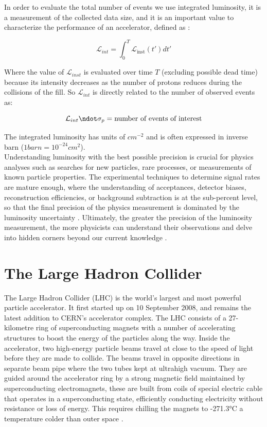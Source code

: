 In order to evaluate the total number of events we use integrated luminosity, it is a measurement of the collected data size, and it is an important value to characterize the performance of an accelerator, defined as \cite{concept_of_luminosity}:

\begin{equation}
  \mathcal{L}_{int}=\int_{0}^{T} \mathcal {L}_{\text{inst}}(t') dt'
\end{equation}

Where the value of $\mathcal{L}_{inst}$ is evaluated over time $T$ (excluding possible dead time) because its intensity decreases as the number of protons reduces during the collisions of the fill. So $\mathcal{L}_{int}$ is directly related to the number of observed events as:

\begin{equation}
  \mathcal{L}_{int} \ndot \sigma_{p}= \text{number of events of interest}
\end{equation}

The integrated luminosity has units of $cm^{-2}$ and is often expressed in inverse barn ($1 barn= 10^{-24}cm^{2}$). \\

Understanding luminosity with the best possible precision is crucial for physics analyses such as searches for new particles, rare processes, or measurements of known particle properties.
The experimental techniques to determine signal rates are mature enough, where the understanding of acceptances, detector biases, reconstruction efficiencies, or background subtraction is at the sub-percent level, so that the final precision of the physics measurement is dominated by the luminosity uncertainty . Ultimately, the greater the precision of the luminosity measurement, the more physicists can understand their observations and delve into hidden corners beyond our current knowledge \cite{luminosity_importance}.

\section{The Large Hadron Collider}

The Large Hadron Collider (LHC) is the world’s largest and most powerful particle accelerator. It first started up on 10 September 2008, and remains the latest addition to CERN’s accelerator complex. The LHC consists of a 27-kilometre ring of superconducting magnets with a number of accelerating structures to boost the energy of the particles along the way. Inside the accelerator, two high-energy particle beams travel at close to the speed of light before they are made to collide. The beams travel in opposite directions in separate beam pipe where the two tubes kept at ultrahigh vacuum. They are guided around the accelerator ring by a strong magnetic field maintained by superconducting electromagnets, these are built from coils of special electric cable that operates in a superconducting state, efficiently conducting electricity without resistance or loss of energy. This requires chilling the magnets to -271.3°C  a temperature colder than outer space \cite{LHC}.\\ 

